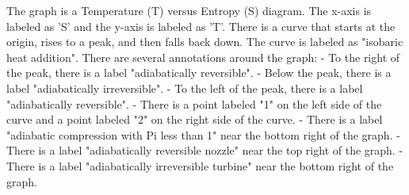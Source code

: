 The graph is a Temperature (T) versus Entropy (S) diagram. The x-axis is labeled as 'S' and the y-axis is labeled as 'T'. There is a curve that starts at the origin, rises to a peak, and then falls back down. The curve is labeled as "isobaric heat addition". There are several annotations around the graph:
- To the right of the peak, there is a label "adiabatically reversible".
- Below the peak, there is a label "adiabatically irreversible".
- To the left of the peak, there is a label "adiabatically reversible".
- There is a point labeled "1" on the left side of the curve and a point labeled "2" on the right side of the curve.
- There is a label "adiabatic compression with Pi less than 1" near the bottom right of the graph.
- There is a label "adiabatically reversible nozzle" near the top right of the graph.
- There is a label "adiabatically irreversible turbine" near the bottom right of the graph.